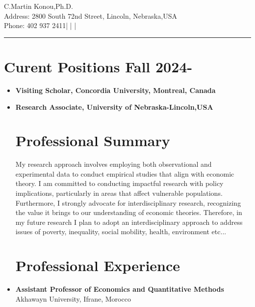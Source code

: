 \documentclass[a4paper,10pt]{article}
\makeatletter
\newcommand{\name}{C.Martin Konou,Ph.D.}
\newcommand{\address}{Address: 2800 South 72nd Street, Lincoln, Nebraska,USA}
\newcommand{\phone}{Phone: 402 937 2411}
\newcommand{\email}{\href{Email : cmkonou@gmail.com}}
\makeatother
\begin{document}
\begin{center}
    {\Huge \name} \\
    \vspace{1mm}
    \address \\
    \phone \enspace | \enspace \email \enspace | \enspace \linkedin \enspace | \enspace \github
\end{center}

\hrule
\vspace{0.5cm}

\section*{Curent Positions Fall 2024-}
\begin{itemize}
   \item \textbf{Visiting Scholar, Concordia University, Montreal, Canada} \hfill 
   \item \textbf{Research Associate, University of Nebraska-Lincoln,USA}


\section*{Professional Summary}
My research approach involves employing both observational and experimental data to conduct empirical studies that align with economic theory. 
I am committed to conducting impactful research with policy implications, particularly in areas that affect vulnerable populations.
Furthermore, I strongly advocate for interdisciplinary research, recognizing the value it brings to our understanding of economic theories. 
Therefore, in my future research I plan to adopt an interdisciplinary approach to address issues of poverty, inequality, social mobility, health, environment etc...

\section*{Professional Experience}
    \item \textbf{Assistant Professor of Economics and Quantitative Methods}
    \hfill Akhawayn University, Ifrane, Morocco





\end{itemize}
\end{document}
